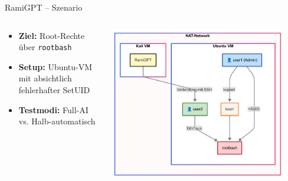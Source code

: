 \documentclass[
	aspectratio=169,	%
	onlytextwidth,		%
	t,					%
	]{beamer}
\begin{document}
\begin{frame}{RamiGPT – Szenario}
	\begin{columns}
		\begin{column}[T]{.45\textwidth}
			\begin{itemize}
				\item \textbf{Ziel:} Root-Rechte über \texttt{rootbash}
				\item \textbf{Setup:} Ubuntu-VM mit absichtlich fehlerhafter SetUID
				\item \textbf{Testmodi:} Full-AI vs. Halb-automatisch
			\end{itemize}
		\end{column}
		\begin{column}[T]{.55\textwidth}
			\centering
			\vspace{-4mm}
			\includegraphics[width=0.9\textwidth]{figures/14.png}
			\label{fig:14}
		\end{column}
	\end{columns}
\end{frame}
\end{document}
